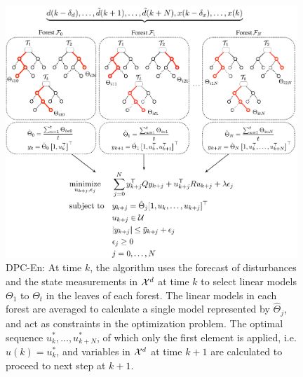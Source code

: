 \begin{figure}[t!]
	\centering
	\includegraphics[width=26pc]{figures/dpc-algo-rf.eps}
	\caption{\textcolor[rgb]{0,0,1}{DPC-En: At time $k$, the algorithm uses the forecast of disturbances and the state measurements in $\mathcal{X}^d$ at time $k$ to select linear models $\Theta_1$ to $\Theta_t$ in the leaves of each forest. The linear models in each forest are averaged to calculate a single model represented by $\hat{\Theta}_j$, and act as constraints in the optimization problem. The optimal sequence $u^*_k,\ldots,u^*_{k+N}$, of which only the first element is applied, i.e. $u(k)=u^*_k$, and variables in $\mathcal{X}^d$ at time $k+1$ are calculated to proceed to next step at $k+1$.}}
	\label{F:dpc-algo-rf}
\end{figure}